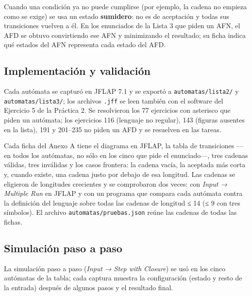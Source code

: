 Cuando una condición ya no puede cumplirse (por ejemplo, la cadena no empieza como se exige) se usa un estado \textbf{sumidero}: no es de aceptación y todas sus transiciones vuelven a él. En los enunciados de la Lista 3 que piden un AFN, el AFD se obtuvo convirtiendo ese AFN y minimizando el resultado; su ficha indica qué estados del AFN representa cada estado del AFD.

\hypertarget{implementaciuxf3n-y-validaciuxf3n}{%
\subsection{Implementación y validación}\label{implementaciuxf3n-y-validaciuxf3n}}

Cada autómata se capturó en JFLAP 7.1 y se exportó a \texttt{automatas/lista2/} y \texttt{automatas/lista3/}; los archivos \texttt{.jff} se leen también con el software del Ejercicio 5 de la Práctica 2. Se resolvieron los 77 ejercicios con asterisco que piden un autómata; los ejercicios 116 (lenguaje no regular), 143 (figuras ausentes en la lista), 191 y 201--235 no piden un AFD y se resuelven en las tareas.

Cada ficha del Anexo A tiene el diagrama en JFLAP, la tabla de transiciones ---en todos los autómatas, no sólo en los cinco que pide el enunciado---, tres cadenas válidas, tres inválidas y los casos frontera: la cadena vacía, la aceptada más corta y, cuando existe, una cadena justo por debajo de esa longitud. Las cadenas se eligieron de longitudes crecientes y se comprobaron dos veces: con \emph{Input → Multiple Run} en JFLAP y con un programa que compara cada autómata contra la definición del lenguaje sobre todas las cadenas de longitud ≤ 14 (≤ 9 con tres símbolos). El archivo \texttt{automatas/pruebas.json} reúne las cadenas de todas las fichas.

\hypertarget{simulaciuxf3n-paso-a-paso}{%
\subsection{Simulación paso a paso}\label{simulaciuxf3n-paso-a-paso}}

La simulación paso a paso (\emph{Input → Step with Closure}) se usó en los cinco autómatas de la tabla; cada captura muestra la configuración (estado y resto de la entrada) después de algunos pasos y el resultado final.

